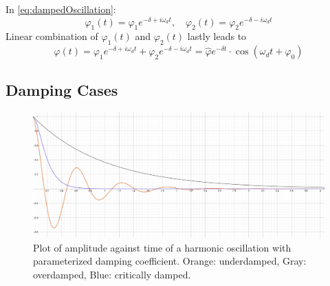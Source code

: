         In \cref{eq:dampedOscillation}:
        \begin{equation}
            \varphi_1(t) = \varphi_1 e^{-\delta + i\omega_d t}, \quad \varphi_2(t) = \varphi_2 e^{-\delta - i\omega_d t}
        \end{equation}
        Linear combination of \( \varphi_1(t) \) and \( \varphi_2(t) \) lastly leads to
        \begin{equation}
            \varphi(t) = \varphi_1 e^{-\delta + i\omega_d t} + \varphi_2 e^{-\delta - i\omega_d t} = \hat{\varphi}e^{-\delta t} \cdot \cos{\left( \omega_d t + \varphi_0 \right)}
        \end{equation}
    \subsection{Damping Cases}\label{sec:preparation_task_2}
    \begin{figure}[H]
        \centering
        \includegraphics[width=.9\textwidth]{Preparation/damping_cases.png}
        \caption[Damping cases of a harmonic oscillation]{Plot of amplitude against time of a harmonic oscillation with
        parameterized damping coefficient. Orange: underdamped, Gray: overdamped, Blue: critically damped.}
        \label{fig:damping_cases_prepTask_2}
    \end{figure}
